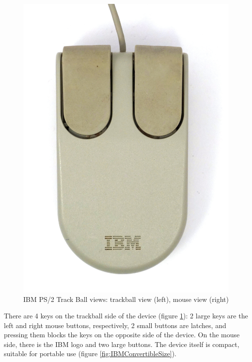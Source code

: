 \documentclass[11pt, a4paper]{article}
\begin{document}
\begin{figure}[h]
    \includegraphics[scale=0.56]{1992_ibm_convertible/bottom_60.jpg}
    \caption{IBM PS/2 Track Ball views: trackball view (left), mouse view (right)}
    \label{fig:IBMConvertibleTopAndBottom}
\end{figure}

There are 4 keys on the trackball side of the device (figure \ref{fig:IBMConvertibleTopAndBottom}): 2 large keys are the left and right mouse buttons, respectively, 2 small buttons are latches, and pressing them blocks the keys on the opposite side of the device. On the mouse side, there is the IBM logo and two large buttons. The device itself is compact, suitable for portable use (figure \ref{fig:IBMConvertibleSize}).
\end{document}
